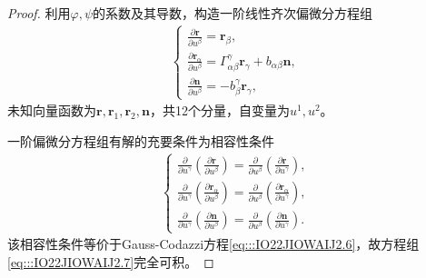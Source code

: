\documentclass[../../main.tex]{subfiles}%
\begin{document}
\begin{proof}

利用$\varphi,\psi$的系数及其导数，构造一阶线性齐次偏微分方程组
\begin{align}
\begin{cases}
\displaystyle\frac{\partial \boldsymbol{r}}{\partial u^\beta} = \boldsymbol{r}_\beta,\\[6pt]
\displaystyle\frac{\partial \boldsymbol{r}_\alpha}{\partial u^\beta} = \Gamma^\gamma_{\alpha\beta}\boldsymbol{r}_\gamma + b_{\alpha\beta}\boldsymbol{n},\\[6pt]
\displaystyle\frac{\partial \boldsymbol{n}}{\partial u^\beta} = -b^\gamma_\beta \boldsymbol{r}_\gamma,
\end{cases}
\label{eq:::IO22JIOWAIJ2.7}
\end{align}
未知向量函数为$\boldsymbol{r},\boldsymbol{r}_1,\boldsymbol{r}_2,\boldsymbol{n}$，共12个分量，自变量为$u^1,u^2$。

一阶偏微分方程组有解的充要条件为相容性条件
\begin{align*}
\begin{cases}
\displaystyle\frac{\partial}{\partial u^\gamma}\left(\frac{\partial \boldsymbol{r}}{\partial u^\beta}\right) = \frac{\partial}{\partial u^\beta}\left(\frac{\partial \boldsymbol{r}}{\partial u^\gamma}\right),\\[6pt]
\displaystyle\frac{\partial}{\partial u^\gamma}\left(\frac{\partial \boldsymbol{r}_\alpha}{\partial u^\beta}\right) = \frac{\partial}{\partial u^\beta}\left(\frac{\partial \boldsymbol{r}_\alpha}{\partial u^\gamma}\right),\\[6pt]
\displaystyle\frac{\partial}{\partial u^\gamma}\left(\frac{\partial \boldsymbol{n}}{\partial u^\beta}\right) = \frac{\partial}{\partial u^\beta}\left(\frac{\partial \boldsymbol{n}}{\partial u^\gamma}\right).
\end{cases}
\end{align*}
该相容性条件等价于Gauss-Codazzi方程\eqref{eq:::IO22JIOWAIJ2.6}，故方程组\eqref{eq:::IO22JIOWAIJ2.7}完全可积。


\end{proof}
\end{document}

